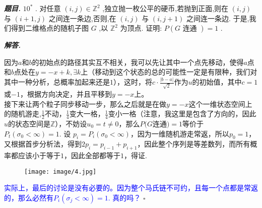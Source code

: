 \documentclass[10pt, a4paper, oneside]{ctexart}
\newenvironment{problem}{\begin{framed}\par\noindent\textbf{\textit{题目. }}}{\end{framed}\par}
\newenvironment{solution}{%
  \par\noindent\textbf{\textit{解答. }}\ignorespaces
}{%
  \hfill\ensuremath{\square}\par %
}
\begin{document}
\begin{problem}
    \( {10}^{ * } \) . 对任意 \( \left( {i,j}\right)  \in  {\mathbb{Z}}^{2} \) ,独立抛一枚公平的硬币,若抛到正面,则在 \( \left( {i,j}\right)  \) 与 \( \left( {i + 1,j}\right)  \) 之间连一条边,否则,在 \( \left( {i,j}\right)  \) 与 \( \left( {i,j + 1}\right)  \) 之间连一条边. 于是,我们得到二维格点的随机子图 \( G \) ,以 \( {\mathbb{Z}}^{2} \) 为顶点. 证明: \( P\left( {G\text{ 连通 }}\right)  = 1 \) .
\end{problem}
\begin{solution}
    因为$a$和$b$的初始点的路径其实互不相关，我可以先让其中一个点先移动，使得$a$点和$b$点处在$y=-x+k,\exists k$上（移动到这个状态的总的可能性一定是有限种，我们对其中一种分析，总概率加起来还是$1$），这时，将$c\cdot\frac{|b-a|}{\sqrt{2}}$作为$u$的初始值，其中$c=1$或$-1$，根据方向决定，并且平移到$y=-x$上。\\接下来让两个粒子同步移动一步，那么之后就是在做$y=-x$这个一维状态空间上的随机游走,$\frac{1}{2}$不动，$\frac{1}{4}$变大一格，$\frac{1}{4}$变小一格（注意，我这里是包含了方向的，因此$u$的状态空间是$\mathbb{Z}$），不妨设$u_0=t\neq 0$，那么$P(G$连通$)=1$等价于$P_t(\sigma_0<\infty)=1$. 设 $p_i=P_i(\sigma_0<\infty)$，因为一维随机游走常返，所以$p_0=1$，又根据首步分析法，得到$2p_{i}=p_{i-1}+p_{i+1}$，因此整个序列是等差数列，而所有概率都应该小于等于$1$，因此全部都等于$1$，得证.
    \begin{figure}[h]
        \centering
        \texttt{[image: image/4.jpg]}
    \end{figure}
    \textcolor{blue}{实际上，最后的讨论是没有必要的。因为整个马氏链不可约，且每一个点都是常返的，那么必然有$P_i(\sigma_j<\infty)=1$. 真的吗？}
\end{solution}
\end{document}
